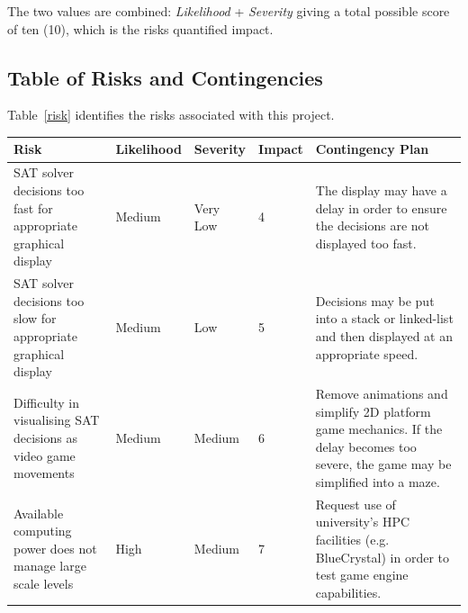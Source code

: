 \documentclass[a4paper]{article}
\begin{document}
\noindent The two values are combined: \textit{Likelihood} + \textit{Severity} giving a total possible
score of ten (10), which is the risks quantified impact.
\subsection{Table of Risks and Contingencies}

Table~\ref{risk} identifies the risks associated with this project.

\begin{center}
    \begin{tabular}{ | p{4.2cm} | l | p{2.1cm} | p{1.1cm} | p{5cm} |}
    \hline
    \rowcolor{Gray}
    Risk & Likelihood & Severity & Impact & Contingency Plan \\ \hline



    SAT solver decisions too fast for appropriate graphical display & Medium & Very Low & 4 &
    The display may have a delay in order to ensure the decisions are not displayed too fast. \\ \hline

    SAT solver decisions too slow for appropriate graphical display & Medium & Low & 5 &
    Decisions may be put into a stack or linked-list and then displayed at an appropriate speed. \\ \hline

    Difficulty in visualising SAT decisions as video game movements & Medium & Medium & 6 & Remove
    animations and simplify 2D platform game mechanics. If the delay becomes too severe, the game may
    be simplified into a maze. \\ \hline

Available computing power does not manage large scale levels & High & Medium & 7 & Request use
of university's HPC facilities (e.g. BlueCrystal) in order to test game engine capabilities. \\
\hline


\end{tabular}
\end{center}
\end{document}
